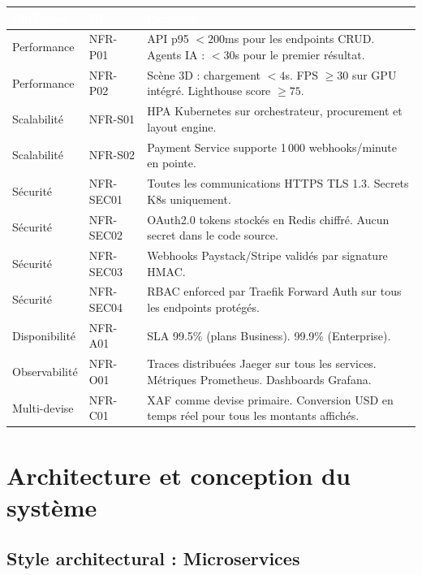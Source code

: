\documentclass[12pt,a4paper]{article}
\begin{document}
\begin{tabularx}{\textwidth}{|l|l|X|}
\hline
\rowcolor{tablehead}\textcolor{white}{\textbf{Catégorie}} & \textcolor{white}{\textbf{ID}} & \textcolor{white}{\textbf{Exigence}} \\
\hline
Performance & NFR-P01 & API p95 $< 200$ms pour les endpoints CRUD. Agents IA : $< 30$s pour le premier résultat. \\
\hline
\rowcolor{tablerow}
Performance & NFR-P02 & Scène 3D : chargement $< 4$s. FPS $\geq 30$ sur GPU intégré. Lighthouse score $\geq 75$. \\
\hline
Scalabilité & NFR-S01 & HPA Kubernetes sur orchestrateur, procurement et layout engine. \\
\hline
\rowcolor{tablerow}
Scalabilité & NFR-S02 & Payment Service supporte 1\,000 webhooks/minute en pointe. \\
\hline
Sécurité & NFR-SEC01 & Toutes les communications HTTPS TLS 1.3. Secrets K8s uniquement. \\
\hline
\rowcolor{tablerow}
Sécurité & NFR-SEC02 & OAuth2.0 tokens stockés en Redis chiffré. Aucun secret dans le code source. \\
\hline
Sécurité & NFR-SEC03 & Webhooks Paystack/Stripe validés par signature HMAC. \\
\hline
\rowcolor{tablerow}
Sécurité & NFR-SEC04 & RBAC enforced par Traefik Forward Auth sur tous les endpoints protégés. \\
\hline
Disponibilité & NFR-A01 & SLA 99.5\% (plans Business). 99.9\% (Enterprise). \\
\hline
\rowcolor{tablerow}
Observabilité & NFR-O01 & Traces distribuées Jaeger sur tous les services. Métriques Prometheus. Dashboards Grafana. \\
\hline
Multi-devise & NFR-C01 & XAF comme devise primaire. Conversion USD en temps réel pour tous les montants affichés. \\
\hline
\end{tabularx}

\section{Architecture et conception du système}

\subsection{Style architectural : Microservices}
\end{document}
